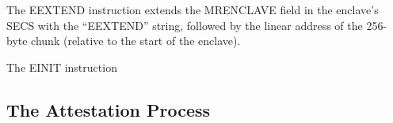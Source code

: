 
The EEXTEND instruction extends the MRENCLAVE field in the enclave's SECS with
the ``EEXTEND'' string, followed by the linear address of the 256-byte chunk
(relative to the start of the enclave).

\begin{table}[hbt]
  \caption{
    Data extended into MRENCLAVE by the EEXTEND instruction.
  }
  \label{fig:eextend_mrenclave}
\end{table}


The EINIT instruction

\subsection{The Attestation Process}








